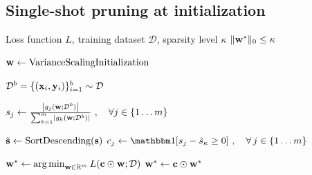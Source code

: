 \subsection{Single-shot pruning at initialization}
\label{sec:single-random}

\begin{algorithm}[t]
\caption{SNIP: Single-shot Network Pruning based on Connection Sensitivity}
\label{alg:prune}
\begin{algorithmic}[1]
    \REQUIRE Loss function $L$, training dataset $\mathcal{D}$, sparsity level $\kappa$ 
    \ENSURE $\|{\mathbf{w}}^*\|_0 \le \kappa$

    \STATE ${\mathbf{w}} \gets \text{VarianceScalingInitialization}$

    \STATE ${\mathcal{D}}^{b} = \{\left( {\mathbf{x}}_i, {\mathbf{y}}_i \right)\}^{b}_{i=1} \sim \mathcal{D}$

    \STATE $s_j \gets \frac{\left|g_j({\mathbf{w}};{\mathcal{D}}^{b})\right|}{\sum_{k=1}^m \left|g_k({\mathbf{w}};{\mathcal{D}}^b)\right|}\ ,\quad \forall j\in \{1\ldots m\}$    

	\STATE $\tilde{{\mathbf{s}}} \gets \text{SortDescending}({\mathbf{s}})$ 
	\STATE $c_j \gets \I[s_j - \tilde{s}_{\kappa} \ge 0]\ ,\quad \forall\,j\in \allweights$
    
     
    
    

    \STATE ${\mathbf{w}}^* \gets \operatorname*{arg\,min}_{{\mathbf{w}}\in\mathbb{R}^m}L({\mathbf{c}} \odot{\mathbf{w}}; {\mathcal{D}})$
    \STATE ${\mathbf{w}}^* \gets {\mathbf{c}} \odot {\mathbf{w}}^*$
\end{algorithmic}
\end{algorithm}

